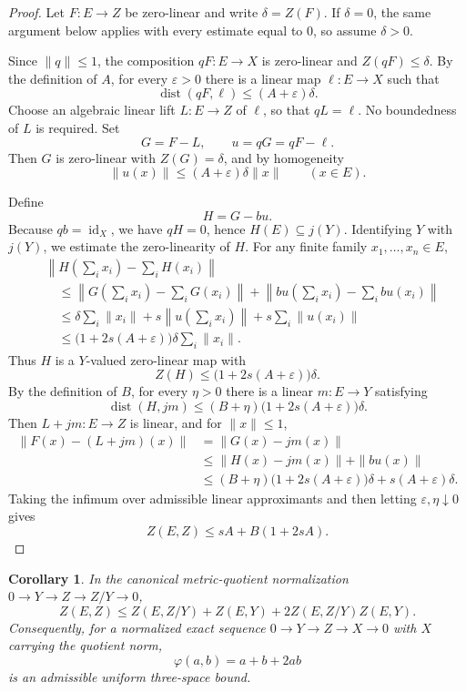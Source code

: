 \documentclass[11pt]{article}
\newtheorem{corollary}{Corollary}
\newcommand{\dist}{\operatorname{dist}}
\newcommand{\id}{\operatorname{id}}
\begin{document}
\begin{proof}
Let $F:E\to Z$ be zero-linear and write $\delta=Z(F)$. If $\delta=0$, the
same argument below applies with every estimate equal to $0$, so assume
$\delta>0$.

Since $\|q\|\leq 1$, the composition $qF:E\to X$ is zero-linear and
$Z(qF)\leq \delta$.  By the definition of $A$, for every $\varepsilon>0$
there is a linear map $\ell:E\to X$ such that
\[
\dist(qF,\ell)\leq (A+\varepsilon)\delta.
\]
Choose an algebraic linear lift $L:E\to Z$ of $\ell$, so that $qL=\ell$.
No boundedness of $L$ is required.  Set
\[
G=F-L,\qquad u=qG=qF-\ell.
\]
Then $G$ is zero-linear with $Z(G)=\delta$, and by homogeneity
\[
\|u(x)\|\leq (A+\varepsilon)\delta \|x\| \qquad (x\in E).
\]

Define
\[
H=G-bu.
\]
Because $qb=\id_X$, we have $qH=0$, hence $H(E)\subseteq j(Y)$.  Identifying
$Y$ with $j(Y)$, we estimate the zero-linearity of $H$. For any finite family
$x_1,\ldots,x_n\in E$,
\[
\begin{aligned}
&\left\|H\left(\sum_i x_i\right)-\sum_i H(x_i)\right\|\\
&\quad\leq
\left\|G\left(\sum_i x_i\right)-\sum_iG(x_i)\right\|
+\left\|b u\left(\sum_i x_i\right)-\sum_i b u(x_i)\right\|\\
&\quad\leq
\delta\sum_i\|x_i\|
+s\left\|u\left(\sum_i x_i\right)\right\|
+s\sum_i\|u(x_i)\|\\
&\quad\leq
\bigl(1+2s(A+\varepsilon)\bigr)\delta\sum_i\|x_i\|.
\end{aligned}
\]
Thus $H$ is a $Y$-valued zero-linear map with
\[
Z(H)\leq \bigl(1+2s(A+\varepsilon)\bigr)\delta.
\]
By the definition of $B$, for every $\eta>0$ there is a linear
$m:E\to Y$ satisfying
\[
\dist(H,jm)\leq
(B+\eta)\bigl(1+2s(A+\varepsilon)\bigr)\delta.
\]
Then $L+jm:E\to Z$ is linear, and for $\|x\|\leq 1$,
\[
\begin{aligned}
\|F(x)-(L+jm)(x)\|
&=\|G(x)-jm(x)\|\\
&\leq \|H(x)-jm(x)\|+\|b u(x)\|\\
&\leq
(B+\eta)\bigl(1+2s(A+\varepsilon)\bigr)\delta
+s(A+\varepsilon)\delta .
\end{aligned}
\]
Taking the infimum over admissible linear approximants and then letting
$\varepsilon,\eta\downarrow 0$ gives
\[
Z(E,Z)\leq sA+B(1+2sA).
\]
\end{proof}

\begin{corollary}
In the canonical metric-quotient normalization
$0\to Y\to Z\to Z/Y\to 0$,
\[
Z(E,Z)\leq Z(E,Z/Y)+Z(E,Y)+2Z(E,Z/Y)Z(E,Y).
\]
Consequently, for a normalized exact sequence
$0\to Y\to Z\to X\to 0$ with $X$ carrying the quotient norm,
\[
\varphi(a,b)=a+b+2ab
\]
is an admissible uniform three-space bound.
\end{corollary}
\end{document}
